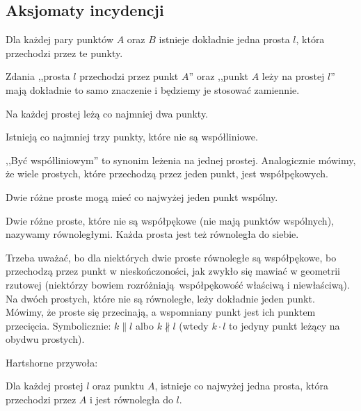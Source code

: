 %

\subsection{Aksjomaty incydencji}
\begin{axiom}[incydencji, I1]
    Dla każdej pary punktów $A$ oraz $B$ istnieje dokładnie jedna prosta $l$, która przechodzi przez te punkty.
\end{axiom}

Zdania ,,prosta $l$ przechodzi przez punkt $A$'' oraz ,,punkt $A$ leży na prostej $l$'' mają dokładnie to samo znaczenie i będziemy je stosować zamiennie.

\begin{axiom}[incydencji, I2]
    Na każdej prostej leżą co najmniej dwa punkty.
\end{axiom}

\begin{axiom}[incydencji, I3]
    Istnieją co najmniej trzy punkty, które nie są współliniowe.
\end{axiom}

,,Być współliniowym'' to synonim leżenia na jednej prostej.
%
Analogicznie mówimy, że wiele prostych, które przechodzą przez jeden punkt, jest współpękowych.

\begin{proposition}
    Dwie różne proste mogą mieć co najwyżej jeden punkt wspólny.
\end{proposition}

\begin{definition}
    Dwie różne proste, które nie są współpękowe (nie mają punktów wspólnych), nazywamy równoległymi.
    Każda prosta jest też równoległa do siebie.
\end{definition}
%

Trzeba uważać, bo dla niektórych dwie proste równoległe są współpękowe, bo przechodzą przez punkt w nieskończoności, jak zwykło się mawiać w geometrii rzutowej (niektórzy bowiem rozróżniają współpękowość właściwą i niewłaściwą).
Na dwóch prostych, które nie są równoległe, leży dokładnie jeden punkt.
Mówimy, że proste się przecinają, a wspomniany punkt jest ich punktem przecięcia.
Symbolicznie: $k \parallel l$ albo $k \nparallel l$ (wtedy $k \cdot l$ to jedyny punkt leżący na obydwu prostych).

Hartshorne \cite[s. 38]{hartshorne2000} przywoła:

\begin{axiom}[Playfaira, P]
    Dla każdej prostej $l$ oraz punktu $A$, istnieje co najwyżej jedna prosta, która przechodzi przez $A$ i jest równoległa do $l$.
\end{axiom}
%

